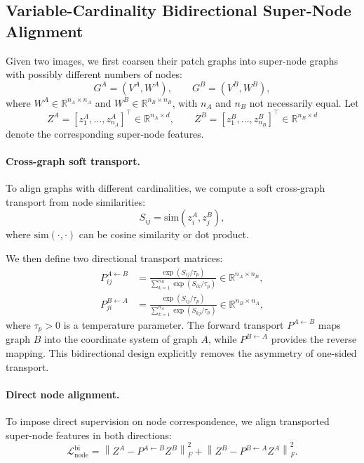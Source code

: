 
\subsection{Variable-Cardinality Bidirectional Super-Node Alignment}

Given two images, we first coarsen their patch graphs into super-node graphs
with possibly different numbers of nodes:
\[
G^A=(V^A,W^A), \qquad G^B=(V^B,W^B),
\]
where \(W^A \in \mathbb{R}^{n_A \times n_A}\) and
\(W^B \in \mathbb{R}^{n_B \times n_B}\), with \(n_A\) and \(n_B\) not
necessarily equal.
Let
\[
Z^A = [z_1^A,\dots,z_{n_A}^A]^\top \in \mathbb{R}^{n_A \times d},
\qquad
Z^B = [z_1^B,\dots,z_{n_B}^B]^\top \in \mathbb{R}^{n_B \times d}
\]
denote the corresponding super-node features.

\paragraph{Cross-graph soft transport.}
To align graphs with different cardinalities, we compute a soft cross-graph
transport from node similarities:
\[
S_{ij} = \mathrm{sim}(z_i^A, z_j^B),
\]
where \(\mathrm{sim}(\cdot,\cdot)\) can be cosine similarity or dot product.

We then define two directional transport matrices:
\begin{align}
P^{A\leftarrow B}_{ij}
&=
\frac{\exp(S_{ij}/\tau_p)}
{\sum\limits_{k=1}^{n_B}\exp(S_{ik}/\tau_p)}
\in \mathbb{R}^{n_A \times n_B}, \\
P^{B\leftarrow A}_{ji}
&=
\frac{\exp(S_{ij}/\tau_p)}
{\sum\limits_{k=1}^{n_A}\exp(S_{kj}/\tau_p)}
\in \mathbb{R}^{n_B \times n_A},
\end{align}
where \(\tau_p>0\) is a temperature parameter.
The forward transport \(P^{A\leftarrow B}\) maps graph \(B\) into the
coordinate system of graph \(A\), while \(P^{B\leftarrow A}\) provides the
reverse mapping. This bidirectional design explicitly removes the asymmetry of
one-sided transport.

\paragraph{Direct node alignment.}
To impose direct supervision on node correspondence, we align transported
super-node features in both directions:
\begin{equation}
\mathcal{L}_{\mathrm{node}}^{\mathrm{bi}}
=
\left\| Z^A - P^{A\leftarrow B} Z^B \right\|_F^2
+
\left\| Z^B - P^{B\leftarrow A} Z^A \right\|_F^2.
\end{equation}

